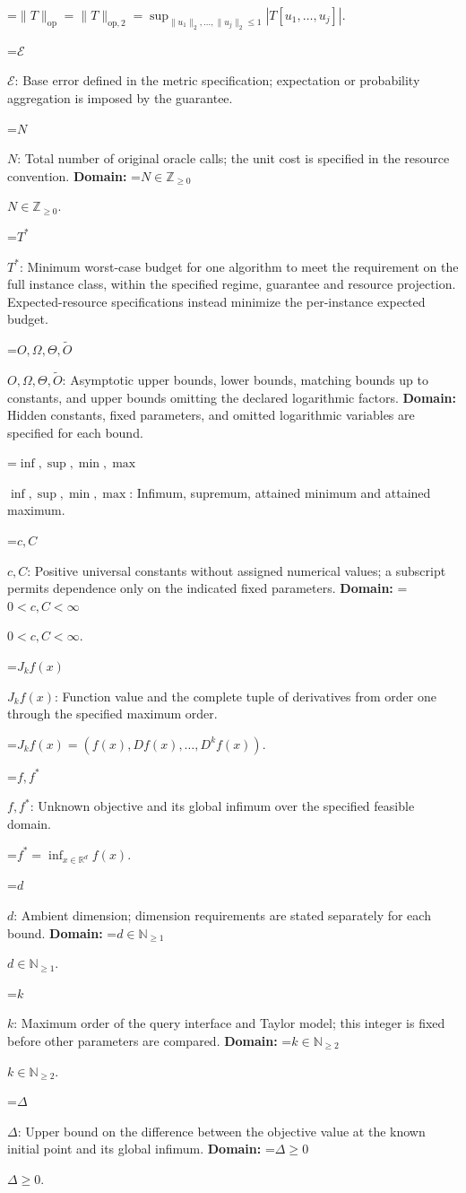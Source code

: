 \documentclass[10pt,a4paper]{article}
\newcommand{\AtlasMath}[1]{\par\begingroup\centering\setbox0=\hbox{$\displaystyle #1$}\ifdim\wd0>1.4\linewidth\typeout{ATLAS WIDE FORMULA: \the\wd0}\fi\ifdim\wd0>\linewidth\resizebox{\linewidth}{!}{\box0}\else\box0\fi\par\endgroup}
\newcommand{\AtlasInlineMath}[1]{\begingroup\setbox0=\hbox{$#1$}\ifdim\wd0>.4\linewidth\endgroup\AtlasMath{#1}\else\endgroup$#1$\fi}
\begin{document}
\AtlasMath{\|T\|_{\mathrm{op}}=\|T\|_{\mathrm{op},2}=\sup_{\|u_1\|_2,\ldots,\|u_j\|_2\le1}|T[u_1,\ldots,u_j]|.}


\AtlasInlineMath{\mathcal{E}}: Base error defined in the metric specification; expectation or probability aggregation is imposed by the guarantee.

\AtlasInlineMath{N}: Total number of original oracle calls; the unit cost is specified in the resource convention. \textbf{Domain:} \AtlasInlineMath{N\in\mathbb{Z}_{\ge0}}.

\AtlasInlineMath{T^*}: Minimum worst-case budget for one algorithm to meet the requirement on the full instance class, within the specified regime, guarantee and resource projection. Expected-resource specifications instead minimize the per-instance expected budget.

\AtlasInlineMath{O,\Omega,\Theta,\widetilde{O}}: Asymptotic upper bounds, lower bounds, matching bounds up to constants, and upper bounds omitting the declared logarithmic factors. \textbf{Domain:} Hidden constants, fixed parameters, and omitted logarithmic variables are specified for each bound.

\AtlasInlineMath{\inf,\sup,\min,\max}: Infimum, supremum, attained minimum and attained maximum.

\AtlasInlineMath{c,C}: Positive universal constants without assigned numerical values; a subscript permits dependence only on the indicated fixed parameters. \textbf{Domain:} \AtlasInlineMath{0<c,C<\infty}.

\AtlasInlineMath{J_{k}f(x)}: Function value and the complete tuple of derivatives from order one through the specified maximum order.


\AtlasMath{J_{k}f(x)=(f(x),Df(x),\ldots,D^{k}f(x)).}


\AtlasInlineMath{f,f^*}: Unknown objective and its global infimum over the specified feasible domain.


\AtlasMath{f^*=\inf_{x\in \mathbb{R}^d}f(x).}


\AtlasInlineMath{d}: Ambient dimension; dimension requirements are stated separately for each bound. \textbf{Domain:} \AtlasInlineMath{d\in\mathbb{N}_{\ge1}}.

\AtlasInlineMath{k}: Maximum order of the query interface and Taylor model; this integer is fixed before other parameters are compared. \textbf{Domain:} \AtlasInlineMath{k\in\mathbb{N}_{\ge2}}.

\AtlasInlineMath{\Delta}: Upper bound on the difference between the objective value at the known initial point and its global infimum. \textbf{Domain:} \AtlasInlineMath{\Delta\ge0}.
\end{document}
